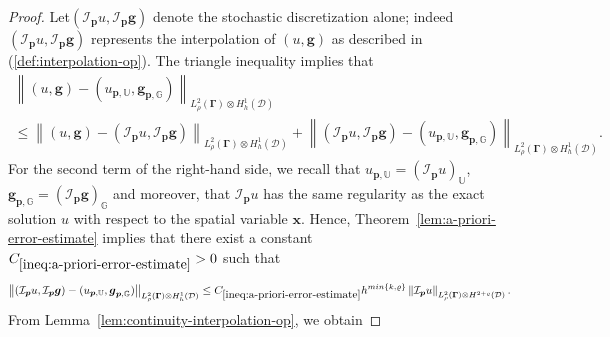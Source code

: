 \documentclass[final,onefignum,onetabnum]{mousaviart}
\begin{document}
			\vspace*{1mm}
			\begin{proof}
				Let$(\mathcal{I}_{\boldsymbol{p}}u, \mathcal{I}_{\boldsymbol{p}}\boldsymbol{g})$
				denote the stochastic discretization alone; indeed $(\mathcal{I}_{\boldsymbol{p}}u, \mathcal{I}_{\boldsymbol{p}}\boldsymbol{g})$ represents the interpolation of $(u, \boldsymbol{g})$ as described in (\ref{def:interpolation-op}). The triangle inequality implies that
				\begin{multline}
					\label{ineq:a-poriori-triangle}
					\left\|  (u, \boldsymbol{g}) - (u_{\boldsymbol{p},\mathbb{U}}, \boldsymbol{g}_{\boldsymbol{p},\mathbb{G}})\right\| _{ L^2_\rho(\boldsymbol{\Gamma}) \otimes H^1_h(\mathcal{D}) } 
					\\
					\leq 
					\left\|  (u, \boldsymbol{g}) - (\mathcal{I}_{\boldsymbol{p}} u, \mathcal{I}_{\boldsymbol{p}} \boldsymbol{g})\right\| _{ L^2_\rho(\boldsymbol{\Gamma}) \otimes H^1_h(\mathcal{D}) }
					+
					\left\|  (\mathcal{I}_{\boldsymbol{p}}u, \mathcal{I}_{\boldsymbol{p}}\boldsymbol{g}) - (u_{\boldsymbol{p},\mathbb{U}}, \boldsymbol{g}_{\boldsymbol{p},\mathbb{G}})\right\| _{L^2_\rho(\boldsymbol{\Gamma}) \otimes H^1_h(\mathcal{D})}.
				\end{multline}
				For the second term of the right-hand side, %
				we recall that  $u_{\boldsymbol{p},\mathbb{U}} = \left( \mathcal{I}_{\boldsymbol{p}} u\right) _{\mathbb{U}}$,  $\boldsymbol{g}_{\boldsymbol{p} ,\mathbb{G}} = \left( \mathcal{I}_{\boldsymbol{p}} \boldsymbol{g}\right) _{\mathbb{G}}$ and moreover, that $\mathcal{I}_{\boldsymbol{p}} u$ has the same regularity as the exact solution $u$ with respect to the spatial variable $\boldsymbol{x}$. Hence, Theorem~\ref{lem:a-priori-error-estimate} implies that there exist a constant $C_{\ref{ineq:a-priori-error-estimate}}>0$ such that 
				\begin{equation}
					\label{ineq:a-poriori-error-space-interpolation}
					\left\|  (\mathcal{I}_{\boldsymbol{p}}u, \mathcal{I}_{\boldsymbol{p}} \boldsymbol{g}) - (u_{\boldsymbol{p} ,\mathbb{U}}, \boldsymbol{g}_{\boldsymbol{p},\mathbb{G}})\right\| _{L^2_\rho(\boldsymbol{\Gamma}) \otimes H^1_h(\mathcal{D})}
					\leq
					C_{\ref{ineq:a-priori-error-estimate}} h^{min\lbrace k, \varrho \rbrace } \left\| \mathcal{I}_{\boldsymbol{p}}u  \right\|_{ L^2_\rho(\boldsymbol{\Gamma}) \otimes H^{2+\varrho}(\mathcal{D}) }.
				\end{equation}
				From Lemma~\ref{lem:continuity-interpolation-op}, we obtain  

\end{proof}
\end{document}
